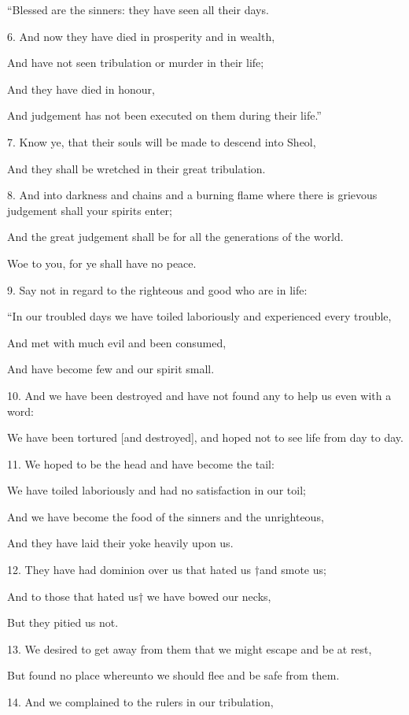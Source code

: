 “Blessed are the sinners: they have seen all their days.

6. And now they have died in prosperity and in wealth,

And have not seen tribulation or murder in their life;

And they have died in honour,

And judgement has not been executed on them during their life.”

7. Know ye, that their souls will be made to descend into Sheol,

And they shall be wretched in their great tribulation.

8. And into darkness and chains and a burning flame where there is grievous judgement shall your spirits enter;

And the great judgement shall be for all the generations of the world.

Woe to you, for ye shall have no peace.

9. Say not in regard to the righteous and good who are in life:

“In our troubled days we have toiled laboriously and experienced every trouble,

And met with much evil and been consumed,

And have become few and our spirit small.

10. And we have been destroyed and have not found any to help us even with a word:

We have been tortured [and destroyed], and hoped not to see life from day to day.

11. We hoped to be the head and have become the tail:

We have toiled laboriously and had no satisfaction in our toil;

And we have become the food of the sinners and the unrighteous,

And they have laid their yoke heavily upon us.

12. They have had dominion over us that hated us †and smote us;

And to those that hated us† we have bowed our necks,

But they pitied us not.

13. We desired to get away from them that we might escape and be at rest,

But found no place whereunto we should flee and be safe from them.

14. And we complained to the rulers in our tribulation,

